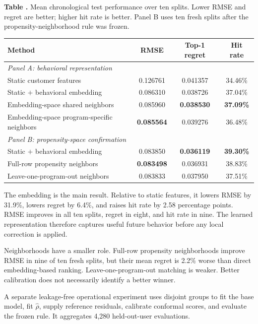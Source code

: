 \documentclass[10pt]{article}
\theoremstyle{noteplain}
\theoremstyle{definition}
\begin{document}
\begin{center}
\parbox{.94\linewidth}{\small\textbf{Table \thetable.} Mean chronological test performance over ten splits. Lower RMSE and regret are better; higher hit rate is better. Panel B uses ten fresh splits after the propensity-neighborhood rule was frozen.}
\vspace{.25em}

\small
\begin{tabular}{lccc}
\toprule
Method & RMSE & Top-1 regret & Hit rate \\
\midrule
\multicolumn{4}{l}{\emph{Panel A: behavioral representation}}\\
Static customer features & 0.126761 & 0.041357 & 34.46\%\\
Static $+$ behavioral embedding & 0.086310 & 0.038726 & 37.04\%\\
Embedding-space shared neighbors & 0.085960 & \textbf{0.038530} & \textbf{37.09\%}\\
Embedding-space program-specific neighbors & \textbf{0.085564} & 0.039276 & 36.48\%\\
\midrule
\multicolumn{4}{l}{\emph{Panel B: propensity-space confirmation}}\\
Static $+$ behavioral embedding & 0.083850 & \textbf{0.036119} & \textbf{39.30\%}\\
Full-row propensity neighbors & \textbf{0.083498} & 0.036931 & 38.83\%\\
Leave-one-program-out neighbors & 0.083833 & 0.037950 & 37.51\%\\
\bottomrule
\end{tabular}
\end{center}

The embedding is the main result. Relative to static features, it lowers RMSE by 31.9\%, lowers regret by 6.4\%, and raises hit rate by 2.58 percentage points. RMSE improves in all ten splits, regret in eight, and hit rate in nine. The learned representation therefore captures useful future behavior before any local correction is applied.

Neighborhoods have a smaller role. Full-row propensity neighborhoods improve RMSE in nine of ten fresh splits, but their mean regret is 2.2\% worse than direct embedding-based ranking. Leave-one-program-out matching is weaker. Better calibration does not necessarily identify a better winner.

A separate leakage-free operational experiment uses disjoint groups to fit the base model, fit $\widehat\rho$, supply reference residuals, calibrate conformal scores, and evaluate the frozen rule. It aggregates 4,280 held-out-user evaluations.
\end{document}
